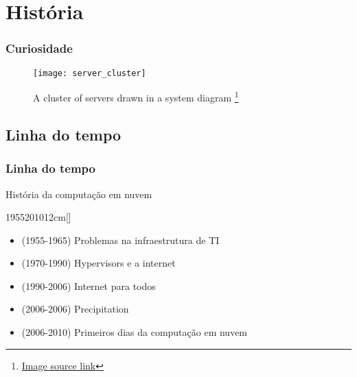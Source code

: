 \section{História}

\begin{frame}
	\frametitle{Curiosidade}
	\begin{figure}[htpb]
		\centering
		\texttt{[image: server\_cluster]}
		\caption{A cluster of servers drawn in a system diagram \footnote{\href{https://www.youtube.com/watch?v=e3UMvBP2RRo}{Image source link}}}
	\end{figure}
\end{frame}

\subsection{Linha do tempo}

\begin{frame}
	\frametitle{Linha do tempo}
	\begin{center}
		História da computação em nuvem\cite{CCHistory}
	\end{center}
	\begin{scriptsize}
	\begin{bf}
	\begin{center}
		\begin{chronology}[10]{1955}{2010}{12cm}[\textwidth]
		\end{chronology}
	\end{center}
	\end{bf}
	\begin{itemize}
		\item (1955-1965) Problemas na infraestrutura de TI
		\item (1970-1990) Hypervisors e a internet
		\item (1990-2006) Internet para todos
		\item (2006-2006) Precipitation
		\item (2006-2010) Primeiros dias da computação em nuvem
	\end{itemize}
	\end{scriptsize}
\end{frame}

